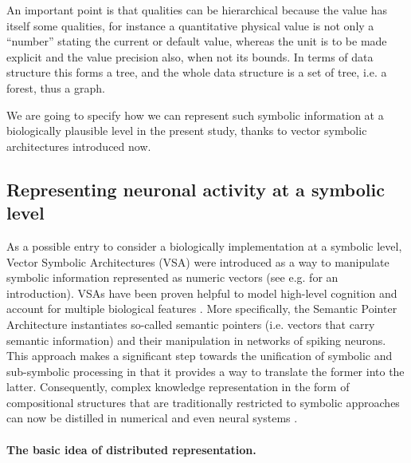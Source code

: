 \documentclass[a4]{article}
\begin{document}
An important point is that qualities can be hierarchical because the value has itself some qualities, for instance a quantitative physical value is not only a ``number'' stating the current or default value, whereas the unit is to be made explicit and the value precision also, when not its bounds. In terms of data structure this forms a tree, and the whole data structure is a set of tree, i.e. a forest, thus a graph.

We are going to specify how we can represent such symbolic information at a biologically plausible level in the present study, thanks to vector symbolic architectures introduced now.

\subsection{Representing neuronal activity at a symbolic level}

As a possible entry to consider a biologically implementation at a symbolic level,  Vector Symbolic Architectures (VSA) were introduced as a way to manipulate symbolic information represented as numeric vectors (see e.g. \cite{levy_vector_2008} for an introduction). VSAs have been proven helpful to model high-level cognition and account for multiple biological features \cite{gayler_vector_2003,eliasmith_how_2013}. More specifically, the Semantic Pointer Architecture \cite{eliasmith_how_2013} instantiates so-called semantic pointers (i.e. vectors that carry semantic information) and their manipulation in networks of spiking neurons. This approach makes a significant step towards the unification of symbolic and sub-symbolic processing in that it provides a way to translate the former into the latter. Consequently, complex knowledge representation in the form of compositional structures that are traditionally restricted to symbolic approaches can now be distilled in numerical and even neural systems \cite{crawford_biologically_2016}.

\paragraph{The basic idea of distributed representation.} 
\end{document}
